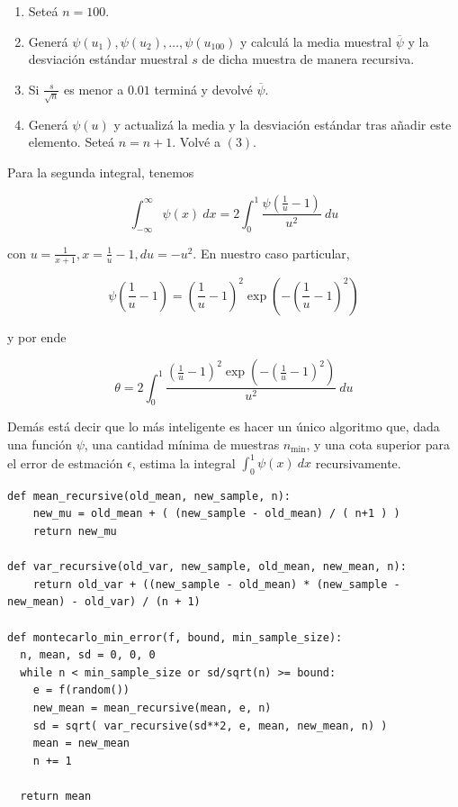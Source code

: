 \documentclass[a4paper, 12pt]{article}
\begin{document}
\begin{enumerate}
    \item Seteá $n = 100$.
    \item Generá $\psi(u_1), \psi(u_2), \ldots, \psi(u_{100})$ y calculá la
        media muestral $\overline{\psi}$ y la desviación estándar muestral $s$ de dicha muestra de
        manera recursiva. 
    \item Si $\frac{s}{\sqrt{n} }$ es menor a $0.01$ terminá y devolvé
        $\overline{\psi}$.
    \item Generá $\psi(u)$ y actualizá la media y la desviación estándar tras
        añadir este elemento. Seteá $n = n + 1$. Volvé a $(3)$.
\end{enumerate}

Para la segunda integral, tenemos 

\begin{equation*}
    \int_{-\infty}^\infty \psi(x) ~ dx = 2\int_0^1 \frac{\psi\left( \frac{1}{u} -
    1\right) }{u^2} ~ du
\end{equation*}

con $u = \frac{1}{x+1}, x = \frac{1}{u} - 1, du = -u^2$. En nuestro caso
particular, 

\begin{equation*}
    \psi\left( \frac{1}{u} - 1 \right) = \left( \frac{1}{u} - 1 \right)^2
    \exp\left( - \left( \frac{1}{u} -1 \right) ^2 \right) 
\end{equation*}

y por ende

\begin{equation*}
    \theta = 2 \int_0^1 \frac{\left( \frac{1}{u} -1 \right)^2 \exp\left( -
    \left( \frac{1}{u} -1 \right)^2  \right)  }{u^2} ~ du
\end{equation*}

Demás está decir que lo más inteligente es hacer un único algoritmo que, dada
una función $\psi$, una cantidad mínima de muestras $n_{\text{min}}$, y una 
cota superior para el error de estmación $\epsilon$, estima la integral
$\int_0^1 \psi(x) ~ dx$ recursivamente.


\begin{verbatim}
def mean_recursive(old_mean, new_sample, n):
    new_mu = old_mean + ( (new_sample - old_mean) / ( n+1 ) )
    return new_mu

def var_recursive(old_var, new_sample, old_mean, new_mean, n):
    return old_var + ((new_sample - old_mean) * (new_sample - new_mean) - old_var) / (n + 1)

def montecarlo_min_error(f, bound, min_sample_size):
  n, mean, sd = 0, 0, 0
  while n < min_sample_size or sd/sqrt(n) >= bound:
    e = f(random())
    new_mean = mean_recursive(mean, e, n)
    sd = sqrt( var_recursive(sd**2, e, mean, new_mean, n) )
    mean = new_mean 
    n += 1

  return mean
\end{verbatim}
\end{document}
